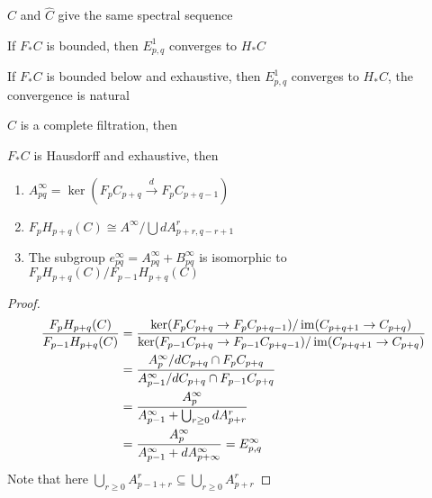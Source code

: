 \documentclass[main]{subfiles}
\begin{document}
\begin{lemma}
$C$ and $\widehat C$ give the same spectral sequence
\end{lemma}

\begin{theorem}
If $F_*C$ is bounded, then $E^1_{p,q}$ converges to $H_*C$ \par
If $F_*C$ is bounded below and exhaustive, then $E^1_{p,q}$ converges to $H_*C$, the convergence is natural
\end{theorem}

\begin{theorem}
$C$ is a complete filtration, then
\begin{center}
\end{center}
\end{theorem}

\begin{lemma}
$F_*C$ is Hausdorff and exhaustive, then
\begin{enumerate}[label=\arabic*., leftmargin=*]
\item $A^\infty_{pq}=\ker(F_pC_{p+q}\xrightarrow dF_{p}C_{p+q-1})$
\item $F_pH_{p+q}(C)\cong A^\infty/\bigcup dA^r_{p+r,q-r+1}$
\item The subgroup $e^\infty_{pq}=A^\infty_{pq}+B^\infty_{pq}$ is isomorphic to $F_pH_{p+q}(C)/F_{p-1}H_{p+q}(C)$
\end{enumerate}
\end{lemma}

\begin{proof}
\begin{align*}
\frac{F_pH_{p+q}(C)}{F_{p-1}H_{p+q}(C)}&=\frac{\ker(F_pC_{p+q}\to F_pC_{p+q-1})/\operatorname{im}(C_{p+q+1}\to C_{p+q})}{\ker(F_{p-1}C_{p+q}\to F_{p-1}C_{p+q-1})/\operatorname{im}(C_{p+q+1}\to C_{p+q})} \\
&=\frac{A_{p}^\infty/dC_{p+q}\cap F_pC_{p+q}}{A_{p-1}^\infty/dC_{p+q}\cap F_{p-1}C_{p+q}} \\
&=\frac{A_{p}^\infty}{A_{p-1}^\infty+\bigcup_{r\geq0}dA_{p+r}^r} \\
&=\frac{A_{p}^\infty}{A_{p-1}^\infty+dA_{p+\infty}^\infty}=E_{p,q}^\infty
\end{align*}
Note that here $\bigcup_{r\geq0}A_{p-1+r}^r\subseteq\bigcup_{r\geq0}A_{p+r}^r$
\end{proof}
\end{document}
